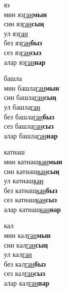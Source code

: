 \begin{multicols}{4}
\begin{enumerate}
\begin{minipage}{\linewidth}
    \item
    яз\\
    мин яз\underline{ган}\textbf{мын}\\
    син яз\underline{ган}\textbf{сың}\\
    ул яз\underline{ган}\\
    без яз\underline{ган}\textbf{быз}\\
    сез яз\underline{ган}\textbf{сыз}\\
    алар яз\underline{ган}\textbf{нар}\\
\end{minipage}

\begin{minipage}{\linewidth}
    \item
    башла\\
    мин башла\underline{ган}\textbf{мын}\\
    син башла\underline{ган}\textbf{сың}\\
    ул башла\underline{ган}\\
    без башла\underline{ган}\textbf{быз}\\
    сез башла\underline{ган}\textbf{сыз}\\
    алар башла\underline{ган}\textbf{нар}\\
\end{minipage}

\begin{minipage}{\linewidth}
    \item
    катнаш\\
    мин катнаш\underline{кан}\textbf{мын}\\
    син катнаш\underline{кан}\textbf{сың}\\
    ул катнаш\underline{кан}\\
    без катнаш\underline{кан}\textbf{быз}\\
    сез катнаш\underline{кан}\textbf{сыз}\\
    алар катнаш\underline{кан}\textbf{нар}\\
\end{minipage}

\begin{minipage}{\linewidth}
    \item
    кал\\
    мин кал\underline{ган}\textbf{мын}\\
    син кал\underline{ган}\textbf{сың}\\
    ул кал\underline{ган}\\
    без кал\underline{ган}\textbf{быз}\\
    сез кал\underline{ган}\textbf{сыз}\\
    алар кал\underline{ган}\textbf{нар}\\
\end{minipage}


\end{enumerate}
\end{multicols}
